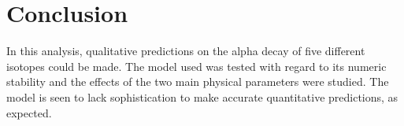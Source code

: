 \documentclass[a4paper,DIV=12,english]{scrartcl}
\begin{document}
\section{Conclusion}
In this analysis, qualitative predictions on the alpha decay of five different isotopes could be made. The model used was tested with regard to its numeric stability and the effects of the two main physical parameters were studied. The model is seen to lack sophistication to make accurate quantitative predictions, as expected.

\newpage
\FloatBarrier
\printbibliography
\end{document}
